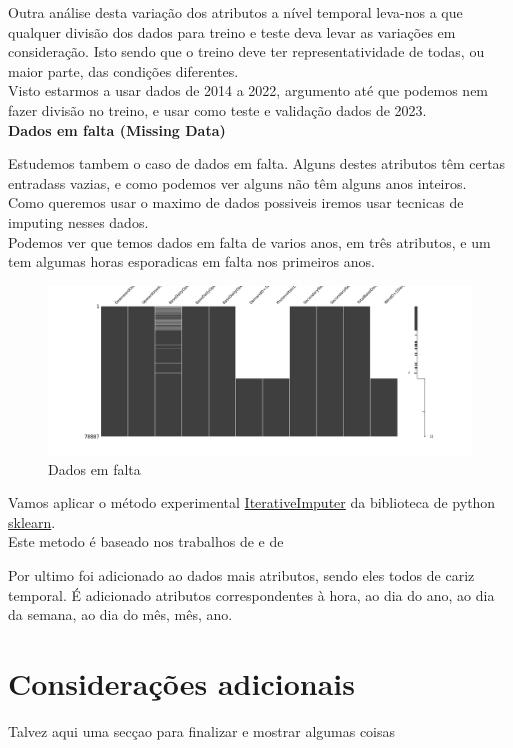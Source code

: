 Outra análise desta variação dos atributos a nível temporal leva-nos a que qualquer divisão dos dados para treino e teste deva levar as variações em consideração. Isto sendo que o treino deve ter representatividade de todas, ou maior parte, das condições diferentes. \\
Visto estarmos a usar dados de 2014 a 2022, argumento até que podemos nem fazer divisão no treino, e usar como teste e validação dados de 2023. \\

\textbf{Dados em falta (Missing Data)}

Estudemos tambem o caso de dados em falta. Alguns destes atributos têm certas entradass vazias, e como podemos ver alguns não têm alguns anos inteiros. \\
Como queremos usar o maximo de dados possiveis iremos usar tecnicas de imputing nesses dados. \\
Podemos ver que temos dados em falta de varios anos, em três atributos, e um tem algumas horas esporadicas em falta nos primeiros anos. \\

\begin{figure}[H]
  \centering
  \includegraphics[width=\textwidth]{../plots/missing_data.png}
  \caption{Dados em falta}
\end{figure}

Vamos aplicar o método experimental \href{https://scikit-learn.org/stable/modules/generated/sklearn.impute.IterativeImputer.html}{IterativeImputer} da biblioteca de python \href{https://scikit-learn.org/stable/index.html}{sklearn}. \\
Este metodo é baseado nos trabalhos de\cite{vanBuuren2011} e de\cite{Buck1960}


Por ultimo foi adicionado ao dados mais atributos, sendo eles todos de cariz temporal. É adicionado atributos correspondentes à hora, ao dia do ano, ao dia da semana, ao dia do mês, mês, ano. \\


\section{Considerações adicionais\label{se:dados_plus}}

Talvez aqui uma secçao para finalizar e mostrar algumas coisas
